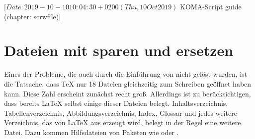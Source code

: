 %
%
%
%
%
%
%
%
% 
%
%
%
%

                 [$Date: 2019-10-10 10:04:30 +0200 (Thu, 10 Oct 2019) $
                  KOMA-Script guide (chapter: scrwfile)]

\chapter{Dateien mit  sparen und ersetzen}

\BeginIndexGroup
{}
Eines der Probleme, die auch durch die Einführung von \eTeX{} nicht gelöst
wurden, ist die Tatsache, dass \TeX{} nur 18 Dateien gleichzeitig zum Schreiben
geöffnet haben kann. Diese Zahl erscheint zunächst recht groß. Allerdings ist
zu berücksichtigen, dass bereits \LaTeX{} selbst einige dieser Dateien
belegt. Inhaltsverzeichnis, Tabellenverzeichnis, Abbildungsverzeichnis, Index,
Glossar und jedes weitere Verzeichnis, das von \LaTeX{} aus erzeugt wird,
belegt in der Regel eine weitere Datei. Dazu kommen Hilfsdateien von Paketen
wie  oder .

